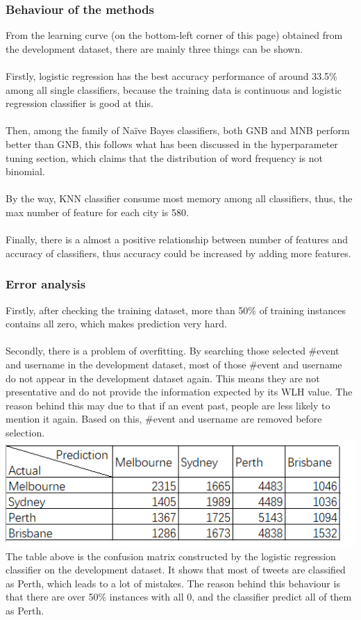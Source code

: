 \documentclass[11pt]{article}
\begin{document}
\subsubsection{Behaviour of the methods}
From the learning curve (on the bottom-left corner of this page) obtained from the development dataset, there are mainly three things can be shown. \\\\
Firstly, logistic regression has the best accuracy performance of around 33.5\% among all single classifiers, because the training data is continuous and logistic regression classifier is good at this. \\\\
Then, among the family of Naïve Bayes classifiers, both GNB and MNB perform better than GNB, this follows what has been discussed in the hyperparameter tuning section, which claims that the distribution of word frequency is not binomial. \\\\
By the way, KNN classifier consume most memory among all classifiers, thus, the max number of feature for each city is 580.\\\\
Finally, there is a almost a positive relationship between number of features and accuracy of classifiers, thus accuracy could be increased by adding more features.
\subsubsection{Error analysis}
Firstly, after checking the training dataset, more than 50\% of training instances contains all zero, which makes prediction very hard.\\\\
 Secondly, there is a problem of overfitting. By searching those selected \#event and username in the development dataset, most of those \#event and username do not appear in the development dataset again. This means they are not presentative and do not provide the information expected by its WLH value. The reason behind this may due to that if an event past, people are less likely to mention it again. Based on this, \#event and username are removed before selection.\\
\includegraphics[scale= 0.75]{confusionMatrix}\\
The table above is the confusion matrix constructed by the logistic regression classifier on the development dataset. It shows that most of tweets are classified as Perth, which leads to a lot of mistakes. The reason behind this behaviour is that there are over 50\% instances with all 0, and the classifier predict all of them as Perth.\\
\end{document}
